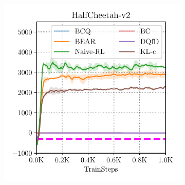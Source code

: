 
\begin{figure}[t!]
\vspace{-0.1in}
    \centering
    \begin{subfigure}[t]{0.23\textwidth}
        \centering
        \includegraphics[width=0.99\linewidth]{chapters/bear/images/images_camera_ready/cheetah_random_final_camera_ready.pdf}

\end{subfigure}
\end{figure}
